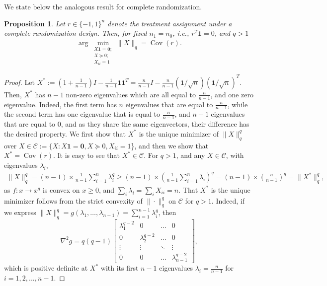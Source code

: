\documentclass[12pt]{article}
\newtheorem{proposition}[theorem]{Proposition}
\theoremstyle{definition}
\numberwithin{equation}{section}
\numberwithin{figure}{section}
\numberwithin{equation}{section}
\numberwithin{figure}{section}
\begin{document}
We state below the analogous result for complete randomization.

\begin{proposition} \label{prop:X_norm_covariance_min_complete}
Let $r \in \{-1,1\}^n$ denote the treatment assignment under a complete randomization design. Then, for fixed $n_1 = n_0$, i.e., $r^T \mathbf{1} = 0$, and $q>1$
    \begin{align*}
        \arg \min_{\substack{X\mathbf{1} =  \mathbf{0};\\ X \succeq 0; \\ X_{ii}=1}} \|X\|_{q} = \operatorname{Cov}(r).
    \end{align*}
\end{proposition}

\begin{proof}[Proof]
    Let $X^* := (1 + \frac{1}{n-1}) I - \frac{1}{n-1} \mathbf{1}\mathbf{1}^T = \frac{n}{n-1} I - \frac{n}{n-1} (\mathbf{1}/\sqrt{n}) (\mathbf{1}/\sqrt{n})^T.$ Then, $X^*$ has $n-1$ non-zero eigenvalues which are all equal to $\frac{n}{n-1}$, and one zero eigenvalue. Indeed, the first term has $n$ eigenvalues that are equal to $\frac{n}{n-1}$, while the second term has one eigenvalue that is equal to $\frac{n}{n-1}$, and $n-1$ eigenvalues that are equal to 0, and as they share the same eigenvectors, their difference has the desired property.
    We first show that $X^*$ is the unique minimizer of $\|X\|_{q}^q$ over $X\in \mathcal{C}:= \{X:X\mathbf{1} = \mathbf{0},X \succeq 0, X_{ii}=1$\}, and then we show that $X^* = \operatorname{Cov}(r).$ 
    It is easy to see that $X^* \in \mathcal{C}$. For $q > 1$, and any $X\in\mathcal{C}$, with eigenvalues $\lambda_i$, 
    \begin{align*}
        \|X\|_{q}^{q} = (n-1) \times  \frac{1}{n-1} \sum_{i=1}^n \lambda_i^{q}  \geq (n-1) \times  (\frac{1}{n-1} \sum_{i=1}^n \lambda_i)^{q} = (n-1) \times  (\frac{n}{n-1})^{q} = \|X^*\|_{q}^{q},
    \end{align*}
    as $ f: x \to x^{q}$ is convex on $x\geq 0$, and $\sum_i \lambda_i = \sum_i X_{ii} = n$. That $X^*$ is the unique minimizer follows from the strict convexity of $\| \cdot \|_{q}^{q}$ on $\mathcal{C}$ for $q > 1$. 
    Indeed, if we express $\|X\|_{q}^{q} = g(\lambda_1,\dots,\lambda_{n-1}) = \sum_{i=1}^{n-1} \lambda_i^{q}$,
    then 
    \[
    \nabla^2 g = q(q-1) 
    \begin{bmatrix}
    \lambda_1^{q-2} & 0 & \dots & 0\\
    0 & \lambda_2^{q-2} & \dots & 0\\
    \vdots & \vdots & \ddots & \vdots \\
    0 & 0 & \dots & \lambda_{n-1}^{q-2}
    \end{bmatrix},
    \]
    which is positive definite at $X^*$ with its first $n-1$ eigenvalues $\lambda_i = \frac{n}{n-1}$ for $i = 1, 2, ..., n-1$.


\end{proof}
\end{document}
